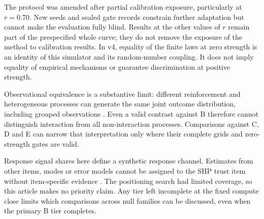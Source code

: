 The protocol was amended after partial calibration exposure, particularly at $r=0.70$. New seeds and sealed gate records constrain further adaptation but cannot make the evaluation fully blind. Results at the other values of $r$ remain part of the prespecified whole curve; they do not remove the exposure of the method to calibration results. In v4, equality of the finite laws at zero strength is an identity of this simulator and its random-number coupling. It does not imply equality of empirical mechanisms or guarantee discrimination at positive strength.

Observational equivalence is a substantive limit: different reinforcement and heterogeneous processes can generate the same joint outcome distribution, including grouped observations \cite{gelastopoulos2025}. Even a valid contrast against B therefore cannot distinguish interaction from all non-interaction processes. Comparisons against C, D and E can narrow that interpretation only where their complete grids and zero-strength gates are valid.

Response signal shares here define a synthetic response channel. Estimates from other items, modes or error models cannot be assigned to the SHP trust item without item-specific evidence \cite{antoun2026,lucasdonnellan2012}. The positioning search had limited coverage, so this article makes no priority claim. Any tier left incomplete at the fixed compute close limits which comparisons across null families can be discussed, even when the primary B tier completes.
